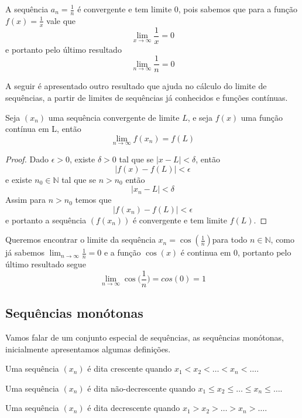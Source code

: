 \begin{ex}
    A sequência $a_n = \frac{1}{n}$ é convergente e tem limite $0$, pois sabemos
    que para a função $f(x) = \frac{1}{x}$ vale que    
    $$\lim_{x \to \infty} \frac{1}{x} = 0$$
    e portanto pelo último resultado
    $$\lim_{n \to \infty} \frac{1}{n} = 0$$
\end{ex}

A seguir é apresentado outro resultado que ajuda no cálculo do limite de 
sequências, a partir de limites de sequências já conhecidos e funções contínuas.

\begin{teo}
    Seja $(x_n)$ uma sequência convergente de limite $L$, e seja $f(x)$ uma função
    contínua em L, então
    $$\lim_{n \to \infty} f(x_n) = f(L)$$
\end{teo}


\begin{proof}
    Dado $\epsilon>0$, existe $\delta > 0$ tal que se $|x - L|< \delta$, então
    $$|f(x)-f(L)| < \epsilon $$
    e existe $n_0 \in \mathbb{N}$ tal que se $n>n_0$ então
    $$|x_n - L|< \delta$$
    Assim para $n>n_0$ temos que
    $$|f(x_n)-f(L)| < \epsilon $$
    e portanto a sequência $(f(x_n))$ é convergente e tem limite $f(L)$.
\end{proof}

\begin{ex}
    Queremos encontrar o limite da sequência $x_n = \cos(\frac{1}{n})$para todo
    $n \in \mathbb{N}$, como já sabemos $\lim_{n \to \infty} \frac{1}{n} = 0$ e 
    a função $\cos(x)$ é continua em $0$, portanto pelo último resultado segue
    $$\lim_{n \to \infty} \cos\bigg(\frac{1}{n}\bigg) = cos(0) = 1$$
\end{ex}

\subsection{Sequências monótonas}

Vamos falar de um conjunto especial de sequências, as sequências monótonas, 
inicialmente apresentamos algumas definições.

Uma sequência $(x_n)$ é dita crescente quando $x_1 < x_2 < \dots < x_n < \dots$.

Uma sequência $(x_n)$ é dita não-decrescente quando $x_1 \leq x_2 \leq \dots 
\leq x_n \leq \dots$.

Uma sequência $(x_n)$ é dita decrescente quando $x_1 > x_2 > \dots > x_n > \dots$.


